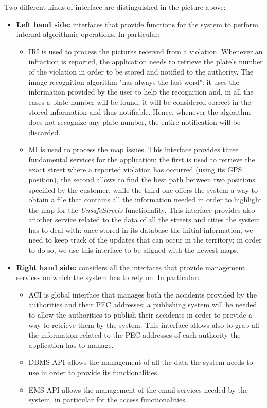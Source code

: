 		Two different kinds of interface are distinguished in the picture above:
		\begin{itemize}
			\item \textbf{Left hand side:} interfaces that provide functions for the system to perform internal algorithmic operations. In particular:
			\begin{itemize}
				\item \textsc{IRI} is used to process the pictures received from a violation. Whenever an infraction is reported, the application needs to retrieve the plate's number of the violation in order to be stored and notified to the authority. The image recognition algorithm "has always the last word": it uses the information provided by the user to help the recognition and, in all the cases a plate number will be found, it will be considered correct in the stored information and thus notifiable. Hence, whenever the algorithm does not recognize any plate number, the entire notification will be discarded.
			
				\item \textsc{MI} is used to process the map issues. This interface provides three fundamental services for the application: the first is used to retrieve the exact street where a reported violation has occurred (using its GPS position), the second allows to find the best path between two positions specified by the customer, while the third one offers the system a way to obtain a file that contains all the information needed in order to highlight the map for the \emph{UnsafeStreets} functionality. This interface provides also another service related to the data of all the streets and cities the system has to deal with: once stored in its database the initial information, we need to keep track of the updates that can occur in the territory; in order to do so, we use this interface to be aligned with the newest maps.
			\end{itemize}
			
			\item \textbf{Right hand side:} considers all the interfaces that provide management services on which the system has to rely on. In particular:
			\begin{itemize}
				\item \textsc{ACI} is global interface that manages both the accidents provided by the authorities and their PEC addresses: a publishing system will be needed to allow the authorities to publish their accidents in order to provide a way to retrieve them by the system. This interface allows also to grab all the information related to the PEC addresses of each authority the application has to manage.
				
				\item \textsc{DBMS API} allows the management of all the data the system needs to use in order to provide its functionalities.
				
				\item \textsc{EMS API} allows the management of the email services needed by the system, in particular for the access functionalities.
			\end{itemize}
		\end{itemize}
	
